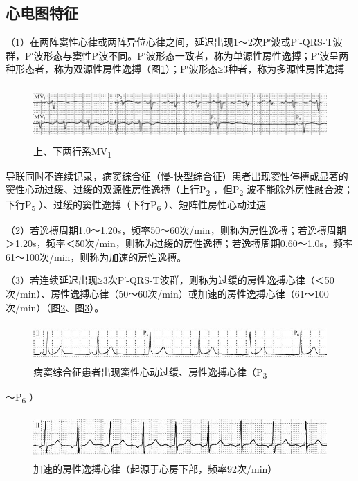\subsection{心电图特征}

（1）在两阵窦性心律或两阵异位心律之间，延迟出现1～2次P′波或P′-QRS-T波群，P′波形态与窦性P波不同。P′波形态一致者，称为单源性房性逸搏；P′波呈两种形态者，称为双源性房性逸搏（图\ref{fig12-2}）；P′波形态≥3种者，称为多源性房性逸搏

\begin{figure}[!htbp]
 \centering
 \includegraphics[width=5.78125in,height=0.83333in]{./images/Image00195.jpg}
 \captionsetup{justification=centering}
 \caption{上、下两行系MV\textsubscript{1}}
 \label{fig12-2}
  \end{figure} 
导联同时不连续记录，病窦综合征（慢-快型综合征）患者出现窦性停搏或显著的窦性心动过缓、过缓的双源性房性逸搏（上行P\textsubscript{2}
，但P\textsubscript{2} 波不能除外房性融合波；下行P\textsubscript{5}
）、过缓的窦性逸搏（下行P\textsubscript{6} ）、短阵性房性心动过速

（2）若逸搏周期1.0～1.20s，频率50～60次/min，则称为房性逸搏；若逸搏周期＞1.20s，频率＜50次/min，则称为过缓的房性逸搏；若逸搏周期0.60～1.0s，频率61～100次/min，则称为加速的房性逸搏。

（3）若连续延迟出现≥3次P′-QRS-T波群，则称为过缓的房性逸搏心律（＜50次/min）、房性逸搏心律（50～60次/min）或加速的房性逸搏心律（61～100次/min）（图\ref{fig12-3}、图\ref{fig12-4}）。

\begin{figure}[!htbp]
 \centering
 \includegraphics[width=5.58333in,height=0.57292in]{./images/Image00196.jpg}
 \captionsetup{justification=centering}
 \caption{病窦综合征患者出现窦性心动过缓、房性逸搏心律（P\textsubscript{3}}
 \label{fig12-3}
  \end{figure} 
～P\textsubscript{6} ）

\begin{figure}[!htbp]
 \centering
 \includegraphics[width=5.58333in,height=0.65625in]{./images/Image00197.jpg}
 \captionsetup{justification=centering}
 \caption{加速的房性逸搏心律（起源于心房下部，频率92次/min）}
 \label{fig12-4}
  \end{figure} 

